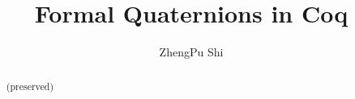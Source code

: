 \documentclass[runningheads]{llncs}
\begin{document}
%
\title{Formal Quaternions in Coq
}
%
%
\author{ZhengPu Shi
}
%
%

%
\maketitle              %
%
\begin{abstract}
  (preserved)
\end{abstract}
%
%
%


\end{document}
